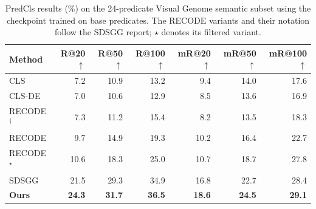 \begin{table}[t]
\centering
\caption{PredCls results (\%) on the 24-predicate Visual Genome semantic subset using the checkpoint trained on base predicates. The RECODE variants and their notation follow the SDSGG report; $\star$ denotes its filtered variant.}
\label{tab:vg_semantic}
\small
\setlength{\tabcolsep}{6.0pt}
\begin{tabular}{lrrrrrr}
\toprule
Method & R@20$\uparrow$ & R@50$\uparrow$ & R@100$\uparrow$ & mR@20$\uparrow$ & mR@50$\uparrow$ & mR@100$\uparrow$ \\
\midrule
CLS \cite{radford2021clip} & 7.2 & 10.9 & 13.2 & 9.4 & 14.0 & 17.6 \\
CLS-DE \cite{li2023recode} & 7.0 & 10.6 & 12.9 & 8.5 & 13.6 & 16.9 \\
RECODE$^{\dagger}$ \cite{li2023recode} & 7.3 & 11.2 & 15.4 & 8.2 & 13.5 & 18.3 \\
RECODE \cite{li2023recode} & 9.7 & 14.9 & 19.3 & 10.2 & 16.4 & 22.7 \\
RECODE$^{\star}$ \cite{li2023recode} & 10.6 & 18.3 & 25.0 & 10.7 & 18.7 & 27.8 \\
SDSGG \cite{chen2024sdsgg} & 21.5 & 29.3 & 34.9 & 16.8 & 22.7 & 28.4 \\
\rowcolor{blue!6}\textbf{Ours} & \textbf{24.3} & \textbf{31.7} & \textbf{36.5} & \textbf{18.6} & \textbf{24.5} & \textbf{29.1} \\
\bottomrule
\end{tabular}
\end{table}
